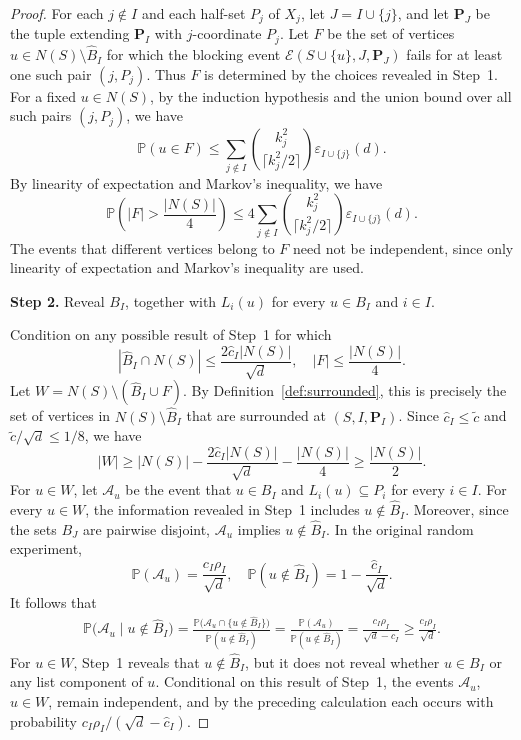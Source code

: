 \documentclass[10pt,a4paper]{amsart}
\numberwithin{equation}{section}
\newcommand{\Prob}{\mathbb{P}}
\begin{document}
\begin{proof}
For each $j \notin I$ and each half-set $P_j$ of $X_j$, let
$J = I \cup \{j\}$, and let $\mathbf{P}_J$ be the tuple extending $\mathbf{P}_I$
with $j$-coordinate $P_j$. Let $F$ be the set of vertices
$u \in N(S) \setminus \hat{B}_{I}$ for which the blocking event
$\mathcal{E}(S \cup \{u\},J,\mathbf{P}_J)$ fails for at least one such pair
$(j,P_j)$. Thus $F$ is determined by the choices revealed in Step~1.
For a fixed $u \in N(S)$, by the induction hypothesis and the union bound over
all such pairs $(j, P_j)$, we have
\[
 \Prob(u \in F) \leq
 \sum_{j \notin I}
 \binom{k_j^2}{\lceil k_j^2/2\rceil}
 \varepsilon_{I \cup \{j\}}(d).
\]
By linearity of expectation and Markov's inequality, we have
\begin{equation}\label{eq:failed-vertex-tail}
 \Prob\left(|F| > \frac{|N(S)|}{4}\right)
 \leq 4\sum_{j \notin I}
 \binom{k_j^2}{\lceil k_j^2/2\rceil}
 \varepsilon_{I \cup \{j\}}(d).
\end{equation}
The events that different vertices belong to $F$ need not be independent,
since only linearity of expectation and Markov's inequality are used.

\medskip
\noindent
\textbf{Step 2.} Reveal $B_I$, together with $L_i(u)$ for every $u\in B_I$
and $i\in I$.
\par\nobreak
\medskip

Condition on any possible result of Step~1 for which
\begin{equation}\label{eq:first-step-bounds}
 |\hat{B}_{I} \cap N(S)|
 \leq \frac{2\hat{c}_{I}|N(S)|}{\sqrt{d}},
 \quad
 |F| \leq \frac{|N(S)|}{4}.
\end{equation}
Let $W=N(S)\setminus(\hat{B}_I\cup F)$. By
Definition~\ref{def:surrounded}, this is precisely the set of vertices in
$N(S)\setminus\hat{B}_I$ that are surrounded at
$(S,I,\mathbf{P}_I)$. Since $\hat{c}_I\leq\widetilde{c}$ and
$\widetilde{c}/\sqrt{d}\leq 1/8$, we have
\[
 |W| \geq |N(S)| - \frac{2\hat{c}_{I}|N(S)|}{\sqrt{d}}
 - \frac{|N(S)|}{4} \geq \frac{|N(S)|}{2}.
\]
For $u \in W$, let $\mathcal{A}_u$ be the event that $u \in B_I$ and
$L_i(u) \subseteq P_i$ for every $i \in I$.
For every $u \in W$, the information revealed in Step~1 includes
$u \notin \hat{B}_{I}$. Moreover, since the sets $B_J$ are pairwise
disjoint, $\mathcal{A}_u$ implies $u \notin \hat{B}_{I}$. In the original
random experiment,
\[
 \Prob(\mathcal{A}_u) = \frac{c_I\rho_I}{\sqrt{d}},
 \quad
 \Prob(u \notin \hat{B}_{I})
 = 1 - \frac{\hat{c}_{I}}{\sqrt{d}}.
\]
It follows that
\[
\begin{aligned}
 \Prob\bigl(\mathcal{A}_u \mid u \notin \hat{B}_{I}\bigr) =
 \frac{
 \Prob\bigl(\mathcal{A}_u
 \cap \{u \notin \hat{B}_{I}\}\bigr)}
 {\Prob(u \notin \hat{B}_{I})} =
 \frac{\Prob(\mathcal{A}_u)}
 {\Prob(u \notin \hat{B}_{I})} =
 \frac{c_I\rho_I}{\sqrt{d} - \hat{c}_{I}}
 \geq \frac{c_I\rho_I}{\sqrt{d}}.
\end{aligned}
\]
For $u\in W$, Step~1 reveals that $u\notin\hat{B}_I$, but it does not
reveal whether $u\in B_I$ or any list component of $u$. Conditional on this
result of Step~1, the events $\mathcal A_u$, $u\in W$, remain independent,
and by the preceding
calculation each occurs with probability
$c_I\rho_I/(\sqrt d-\hat c_I)$.


\end{proof}
\end{document}
